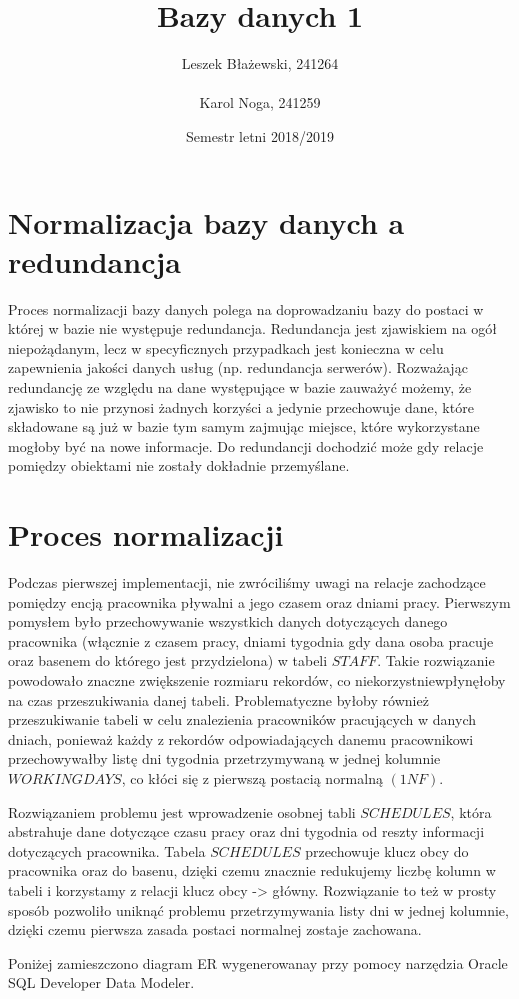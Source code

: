 \documentclass[a4paper]{article}
\title{Bazy danych 1}
\author{Leszek Błażewski, 241264 \\ \\Karol Noga, 241259}
\date{Semestr letni 2018/2019}
\begin{document}
\maketitle

\newpage

\section{Normalizacja bazy danych a redundancja}

Proces normalizacji bazy danych polega na doprowadzaniu bazy do postaci w której w bazie nie występuje redundancja. Redundancja jest zjawiskiem na ogół niepożądanym, lecz w specyficznych przypadkach jest konieczna w celu zapewnienia jakości danych usług (np. redundancja serwerów). Rozważając redundancję ze względu na dane występujące w bazie zauważyć możemy, że zjawisko to nie przynosi żadnych korzyści a jedynie przechowuje dane, które składowane są już w bazie tym samym zajmując miejsce, które wykorzystane mogłoby być na nowe informacje. Do redundancji dochodzić może gdy relacje pomiędzy obiektami nie zostały dokładnie przemyślane.

\section{Proces normalizacji}

Podczas pierwszej implementacji, nie zwróciliśmy uwagi na relacje zachodzące pomiędzy encją pracownika pływalni a jego czasem oraz dniami pracy. Pierwszym pomysłem było przechowywanie wszystkich danych dotyczących danego pracownika (włącznie z czasem pracy, dniami tygodnia gdy dana osoba pracuje oraz basenem do którego jest przydzielona) w tabeli $STAFF$. Takie rozwiązanie powodowało znaczne zwiększenie rozmiaru rekordów, co niekorzystnie\linebreak wpłynęłoby na czas przeszukiwania danej tabeli. Problematyczne byłoby również przeszukiwanie tabeli w celu znalezienia pracowników pracujących w danych dniach, ponieważ każdy z rekordów odpowiadających danemu pracownikowi przechowywałby listę dni tygodnia przetrzymywaną w jednej kolumnie \linebreak $WORKINGDAYS$, co kłóci się z pierwszą postacią normalną $(1NF)$.

\vspace{5mm}
Rozwiązaniem problemu jest wprowadzenie osobnej tabli $SCHEDULES$, która abstrahuje dane dotyczące czasu pracy oraz dni tygodnia od reszty informacji dotyczących pracownika. Tabela $SCHEDULES$ przechowuje klucz obcy do pracownika oraz do basenu, dzięki czemu znacznie redukujemy liczbę kolumn w tabeli i korzystamy z relacji klucz obcy -> główny. Rozwiązanie to też w prosty sposób pozwoliło uniknąć problemu przetrzymywania listy dni w jednej kolumnie, dzięki czemu pierwsza zasada postaci normalnej zostaje zachowana.

\vspace{5mm}
Poniżej zamieszczono diagram ER wygenerowanay przy pomocy narzędzia Oracle SQL Developer Data Modeler.
\newpage
{}
\recalctypearea

\end{document}
